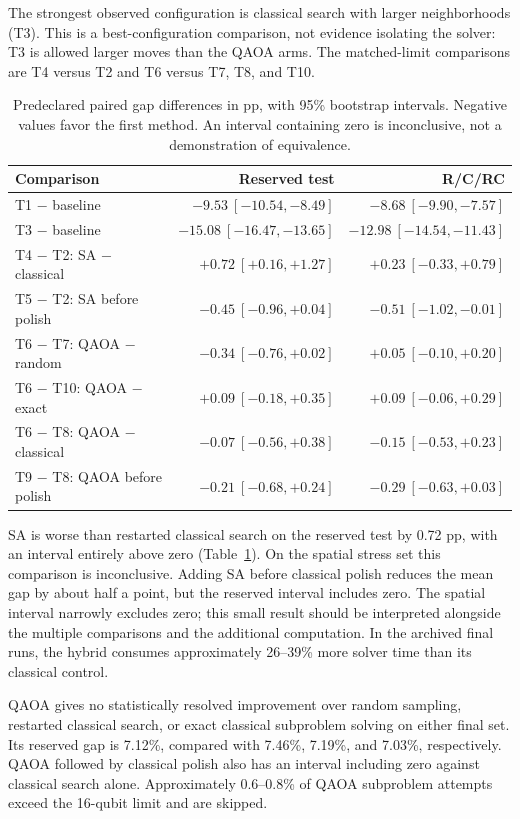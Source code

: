 \documentclass[11pt,a4paper]{article}
\begin{document}
The strongest observed configuration is classical search with larger
neighborhoods (T3). This is a best-configuration comparison, not evidence
isolating the solver: T3 is allowed larger moves than the QAOA arms. The
matched-limit comparisons are T4 versus T2 and T6 versus T7, T8, and T10.

\begin{table}[tbp]
\centering\small
\caption{Predeclared paired gap differences in pp, with 95\% bootstrap
intervals. Negative values favor the first method. An interval containing
zero is inconclusive, not a demonstration of equivalence.}
\label{tab:contrasts}
\begin{tabular}{@{}lrr@{}}
\toprule
Comparison & Reserved test & R/C/RC\\
\midrule
T1 $-$ baseline & $-9.53\ [-10.54,-8.49]$ & $-8.68\ [-9.90,-7.57]$\\
T3 $-$ baseline & $-15.08\ [-16.47,-13.65]$ & $-12.98\ [-14.54,-11.43]$\\
T4 $-$ T2: SA $-$ classical & $+0.72\ [+0.16,+1.27]$ & $+0.23\ [-0.33,+0.79]$\\
T5 $-$ T2: SA before polish & $-0.45\ [-0.96,+0.04]$ & $-0.51\ [-1.02,-0.01]$\\
T6 $-$ T7: QAOA $-$ random & $-0.34\ [-0.76,+0.02]$ & $+0.05\ [-0.10,+0.20]$\\
T6 $-$ T10: QAOA $-$ exact & $+0.09\ [-0.18,+0.35]$ & $+0.09\ [-0.06,+0.29]$\\
T6 $-$ T8: QAOA $-$ classical & $-0.07\ [-0.56,+0.38]$ & $-0.15\ [-0.53,+0.23]$\\
T9 $-$ T8: QAOA before polish & $-0.21\ [-0.68,+0.24]$ & $-0.29\ [-0.63,+0.03]$\\
\bottomrule
\end{tabular}
\end{table}

SA is worse than restarted classical search on the reserved test by
0.72 pp, with an interval entirely above zero (Table~\ref{tab:contrasts}).
On the spatial stress set this comparison is inconclusive. Adding SA before
classical polish reduces the mean gap by about half a point, but the reserved
interval includes zero. The spatial interval narrowly excludes zero; this
small result should be interpreted alongside the multiple comparisons and
the additional computation. In the archived final runs, the hybrid consumes
approximately 26--39\% more solver time than its classical control.

QAOA gives no statistically resolved improvement over random sampling,
restarted classical search, or exact classical subproblem solving on either
final set. Its reserved gap is 7.12\%, compared with 7.46\%, 7.19\%, and
7.03\%, respectively. QAOA followed by classical polish also has an interval
including zero against classical search alone. Approximately 0.6--0.8\% of
QAOA subproblem attempts exceed the 16-qubit limit and are skipped.
\end{document}
